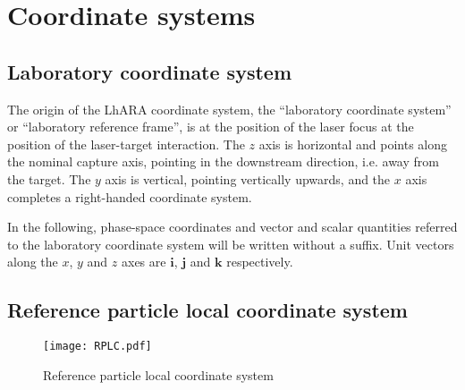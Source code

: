 \graphicspath{ {02-CoordinateSystems/Figures/} }

\section{Coordinate systems}

\subsection{Laboratory coordinate system}

The origin of the LhARA coordinate system, the ``laboratory coordinate
system'' or ``laboratory reference frame'', is at the position of the
laser focus at the position of the laser-target interaction.
The $z$ axis is horizontal and points along the nominal capture axis,
pointing in the downstream direction, i.e. away from the target.
The $y$ axis is vertical, pointing vertically upwards, and the $x$
axis completes a right-handed coordinate system.

In the following, phase-space coordinates and vector and scalar
quantities referred to the laboratory coordinate system will be
written without a suffix.
Unit vectors along the $x$, $y$ and $z$ axes are $\bm{i}$, $\bm{j}$
and $\bm{k}$ respectively.

\subsection{Reference particle local coordinate system}

\begin{figure}
  \begin{center}
    \texttt{[image: RPLC.pdf]}
  \end{center}
  \caption{
    Reference particle local coordinate system
  }
\end{figure}

